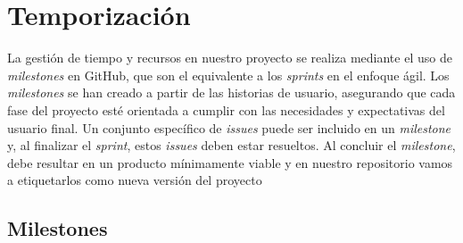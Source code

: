 \section{Temporización}

La gestión de tiempo y recursos en nuestro proyecto se realiza mediante el uso de \textit{milestones} en GitHub, que son el equivalente a los \textit{sprints} en el enfoque ágil. Los \textit{milestones} se han creado a partir de las historias de usuario, asegurando que cada fase del proyecto esté orientada a cumplir con las necesidades y expectativas del usuario final. Un conjunto específico de \textit{issues} puede ser incluido en un \textit{milestone} y, al finalizar el \textit{sprint}, estos \textit{issues} deben estar resueltos. Al concluir el \textit{milestone}, debe resultar en un producto mínimamente viable y en nuestro repositorio vamos a etiquetarlos como nueva versión del proyecto

\subsection{Milestones}

